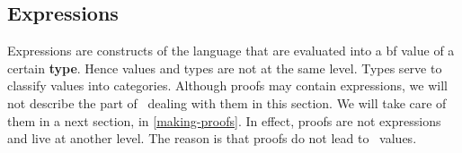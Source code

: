\subsection{Expressions}
\label{expressions}
Expressions are constructs of the language that are evaluated into a
{bf value} of a certain {\bf type}. Hence values and types are not at
the same level. Types serve to classify values into categories.
Although proofs may contain expressions, we will not describe the part
of \focal\ dealing with them in this section. We will take care of
them in a next section, in \ref{making-proofs}. In effect, proofs are
not expressions and live at another level. The reason is that proofs
do not lead to \focal\ values.

